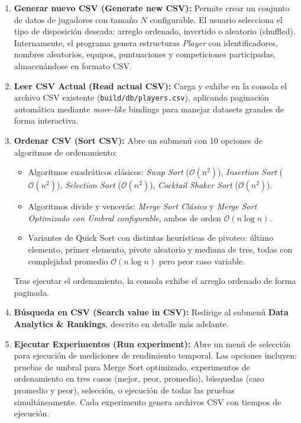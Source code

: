 \begin{enumerate}
    \item \textbf{Generar nuevo CSV (Generate new CSV):} Permite crear un conjunto de datos de jugadores con tamaño $N$ configurable. El usuario selecciona el tipo de disposición deseada: arreglo ordenado, invertido o aleatorio (shuffled). Internamente, el programa genera estructuras \textit{Player} con identificadores, nombres aleatorios, equipos, puntuaciones y competiciones participadas, almacenándose en formato CSV.
    
    \item \textbf{Leer CSV Actual (Read actual CSV):} Carga y exhibe en la consola el archivo CSV existente (\texttt{build/db/players.csv}), aplicando paginación automática mediante \textit{more-like} bindings para manejar datasets grandes de forma interactiva.
    
    \item \textbf{Ordenar CSV (Sort CSV):} Abre un submenú con 10 opciones de algoritmos de ordenamiento:
    \begin{itemize}
        \item Algoritmos cuadráticos clásicos: \textit{Swap Sort} ($\mathcal{O}(n^2)$), \textit{Insertion Sort} ($\mathcal{O}(n^2)$), \textit{Selection Sort} ($\mathcal{O}(n^2)$), \textit{Cocktail Shaker Sort} ($\mathcal{O}(n^2)$).
        \item Algoritmos divide y vencerás: \textit{Merge Sort Clásico} y \textit{Merge Sort Optimizado con Umbral configurable}, ambos de orden $\mathcal{O}(n \log n)$.
        \item Variantes de Quick Sort con distintas heurísticas de pivoteo: último elemento, primer elemento, pivote aleatorio y mediana de tres, todas con complejidad promedio $\mathcal{O}(n \log n)$ pero peor caso variable.
    \end{itemize}
    Tras ejecutar el ordenamiento, la consola exhibe el arreglo ordenado de forma paginada.
    
    \item \textbf{Búsqueda en CSV (Search value in CSV):} Redirige al submenú \textbf{Data Analytics \& Rankings}, descrito en detalle más adelante.
    
    \item \textbf{Ejecutar Experimentos (Run experiment):} Abre un menú de selección para ejecución de mediciones de rendimiento temporal. Las opciones incluyen: pruebas de umbral para Merge Sort optimizado, experimentos de ordenamiento en tres casos (mejor, peor, promedio), búsquedas (caso promedio y peor), selección, o ejecución de todas las pruebas simultáneamente. Cada experimento genera archivos CSV con tiempos de ejecución.
    

\end{enumerate}
